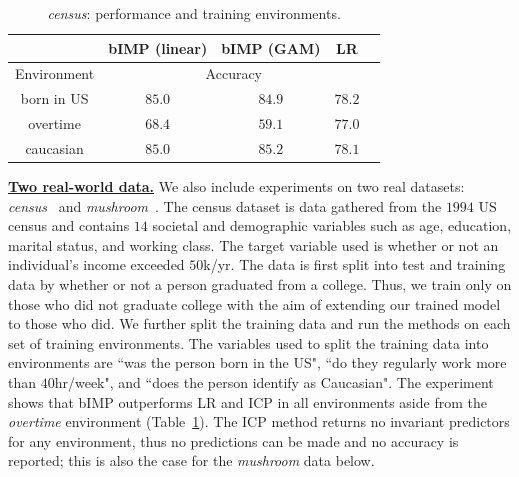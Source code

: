 \documentclass[conference,letterpaper]{IEEEtran}
\begin{document}
\vspace{-1em}
\begin{center} %
\begin{table}[h!]
\begin{center}
{\small
\begin{tabular}{ |c||c|c|c|c|  }
\hline 
  & \textsf{bIMP} (linear) & \textsf{bIMP} (GAM)  & \textsf{LR}\\ %
 \hline
 \hline
 Environment & \multicolumn{3}{|c|}{Accuracy} \\
 \hline
 born in US & $85.0$ & $84.9$ & $78.2$ \\
 overtime   & $68.4$ & $59.1$ & $77.0$ \\
 caucasian  & $85.0$ & $85.2$ & $78.1$ \\
 \hline
\end{tabular}
} %
\caption{\emph{census}: performance and training environments.}\label{tbl::census}
\end{center}
\end{table}
\end{center}
\vspace{-1em}

\noindent\underline{\bf Two real-world data.} We also include experiments on two real datasets: \emph{census}~\cite{misc_adult_2} and \emph{mushroom}~\cite{misc_mushroom_73}. The census dataset is data gathered from the $1994$ US census and contains $14$ societal and demographic variables such as age, education, marital status, and working class. The target variable used is whether or not an individual's income exceeded $50$k/yr. The data is first split into test and training data by whether or not a person graduated from a college. Thus, we train only on those who did not graduate college with the aim of extending our trained model to those who did. We further split the training data and run the methods on each set of training environments. The variables used to split the training data into environments are ``was the person born in the US",  ``do they regularly work more than $40$hr/week", and ``does the person identify as Caucasian". The experiment shows that \textsf{bIMP} outperforms \textsf{LR} and \textsf{ICP} in all environments aside from the \emph{overtime} environment (Table~\ref{tbl::census}). The \textsf{ICP} method returns no invariant predictors for any environment, thus no predictions can be made and no accuracy is reported; this is also the case for the \emph{mushroom} data below.
\end{document}
